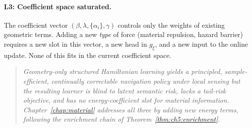 \paragraph{L3: Coefficient space saturated.}
The coefficient vector $(\beta,\lambda,\{\alpha_i\},\gamma)$ controls
only the weights of existing geometric terms.
Adding a new \emph{type} of force (material repulsion, hazard barrier)
requires a new slot in this vector, a new head in $g_\xi$, and a new
input to the online update.
None of this fits in the current coefficient space.

\begin{quote}\itshape
Geometry-only structured Hamiltonian learning yields a principled,
sample-efficient, continually correctable navigation policy under
local sensing but the resulting learner is blind to latent semantic
risk, lacks a tail-risk objective, and has no energy-coefficient
slot for material information.
Chapter~\ref{chap:material} addresses all three by adding new energy
terms, following the enrichment chain of Theorem~\ref{thm:ch5:enrichment}.
\end{quote}